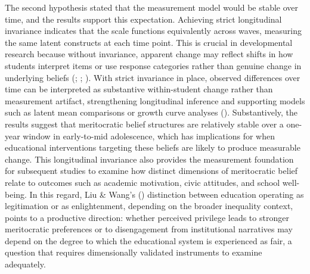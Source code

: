 \documentclass[
  13pt,
]{article}
\begin{document}
The second hypothesis stated that the measurement model would be stable
over time, and the results support this expectation. Achieving strict
longitudinal invariance indicates that the scale functions equivalently
across waves, measuring the same latent constructs at each time point.
This is crucial in developmental research because without invariance,
apparent change may reflect shifts in how students interpret items or
use response categories rather than genuine change in underlying beliefs
(;
;
).
With strict invariance in place, observed differences over time can be
interpreted as substantive within-student change rather than measurement
artifact, strengthening longitudinal inference and supporting models
such as latent mean comparisons or growth curve analyses
().
Substantively, the results suggest that meritocratic belief structures
are relatively stable over a one-year window in early-to-mid
adolescence, which has implications for when educational interventions
targeting these beliefs are likely to produce measurable change. This
longitudinal invariance also provides the measurement foundation for
subsequent studies to examine how distinct dimensions of meritocratic
belief relate to outcomes such as academic motivation, civic attitudes,
and school well-being. In this regard, Liu \& Wang's
() distinction between education
operating as legitimation or as enlightenment, depending on the broader
inequality context, points to a productive direction: whether perceived
privilege leads to stronger meritocratic preferences or to disengagement
from institutional narratives may depend on the degree to which the
educational system is experienced as fair, a question that requires
dimensionally validated instruments to examine adequately.
\end{document}
